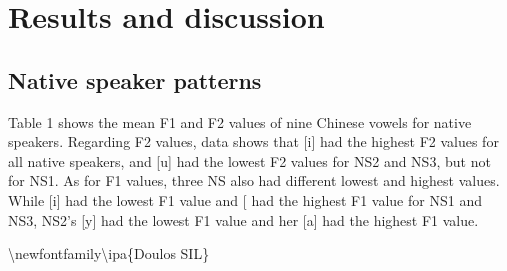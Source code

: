 \documentclass[man, fleqn, noextraspace]{apa6}
\newenvironment{Shaded}{\begin{snugshade}}{\end{snugshade}}
\newcommand{\FunctionTok}[1]{\textcolor[rgb]{0.00,0.00,0.00}{#1}}
\newcommand{\NormalTok}[1]{#1}
\begin{document}
\section{Results and discussion}\label{results-and-discussion}

\subsection{Native speaker patterns}\label{native-speaker-patterns}

Table 1 shows the mean F1 and F2 values of nine Chinese vowels for
native speakers. Regarding F2 values, data shows that {[}i{]} had the
highest F2 values for all native speakers, and {[}u{]} had the lowest F2
values for NS2 and NS3, but not for NS1. As for F1 values, three NS also
had different lowest and highest values. While {[}i{]} had the lowest F1
value and {[}\ipatext{ɑ}{]} had the highest F1 value for NS1 and NS3,
NS2's {[}y{]} had the lowest F1 value and her {[}a{]} had the highest F1
value.

\begin{Shaded}
\begin{Highlighting}[]
\FunctionTok{\textbackslash{}newfontfamily\textbackslash{}ipa}\NormalTok{\{Doulos SIL\} }
\end{Highlighting}
\end{Shaded}
\end{document}
